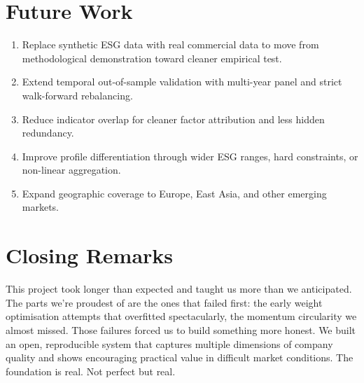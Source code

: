 \section{Future Work}
\label{sec:future}

\begin{enumerate}
    \item Replace synthetic ESG data with real commercial data to move from methodological demonstration toward cleaner empirical test.
    \item Extend temporal out-of-sample validation with multi-year panel and strict walk-forward rebalancing.
    \item Reduce indicator overlap for cleaner factor attribution and less hidden redundancy.
    \item Improve profile differentiation through wider ESG ranges, hard constraints, or non-linear aggregation.
    \item Expand geographic coverage to Europe, East Asia, and other emerging markets.
\end{enumerate}

\section*{Closing Remarks}

\noindent This project took longer than expected and taught us more than we anticipated. The parts we're proudest of are the ones that failed first: the early weight optimisation attempts that overfitted spectacularly, the momentum circularity we almost missed. Those failures forced us to build something more honest. We built an open, reproducible system that captures multiple dimensions of company quality and shows encouraging practical value in difficult market conditions. The foundation is real. Not perfect but real.

